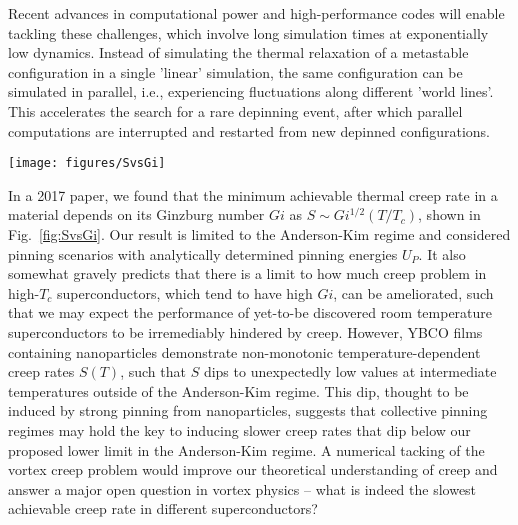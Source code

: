 \documentclass[%
 aip,
 amsmath,amssymb,
 reprint,%
floatfix]{revtex4-1}
\newcommand{\Tc}{T_{c}}
\begin{document}
Recent advances in computational power and high-performance codes will enable tackling these challenges, which involve long simulation times at exponentially low dynamics. Instead of simulating the thermal relaxation of a metastable configuration in a single 'linear' simulation, the same configuration can be simulated in parallel, i.e., experiencing fluctuations along different 'world lines'. This accelerates the search for a rare depinning event, after which parallel computations are interrupted and restarted from new depinned configurations.

%
\begin{figure*}
\texttt{[image: figures/SvsGi]}
\caption{Creep at reduced temperature $T/T_c$ = 1/4 and a field of $\mu_0H = 1 \textnormal{ T}$ for different superconductors plotted versus $Gi^{1/2}$. The open symbols indicate materials for which the microstructure has been modified either by irradiation or incorporation of inclusions. The solid grey line represents the limit set by $Gi^{1/2}(T/T_c)$.  The result predicts that the creep problem even in yet-to-be-discovered high-$T_c$ superconductors may counteract the benefits of high operating temperatures. Material from S. Eley, et al.\ Nat.\ Mater.\ 16, 409–413 (2017). Copyright 2017, \emph{Nature Publishing Group.}
}\label{fig:SvsGi}
\end{figure*}
%




In a 2017 paper\cite{Eley2017a}, we found that the minimum achievable thermal creep rate in a material depends on its Ginzburg number $Gi$ as $S \sim Gi^{1/2}(T/T_c)$, shown in Fig.~\ref{fig:SvsGi}.  Our result is limited to the Anderson-Kim regime and considered pinning scenarios with analytically determined pinning energies $U_P$.  It also somewhat gravely predicts that there is a limit to how much creep problem in high-$\Tc$ superconductors, which tend to have high $Gi$, can be ameliorated, such that we may expect the performance of yet-to-be discovered room temperature superconductors to be irremediably hindered by creep. However, YBCO films containing nanoparticles demonstrate non-monotonic temperature-dependent creep rates $S(T)$, such that $S$ dips to unexpectedly low values at intermediate temperatures outside of the Anderson-Kim regime\cite{Eley2017a}.  This dip, thought to be induced by strong pinning from nanoparticles, suggests that collective pinning regimes may hold the key to inducing slower creep rates that dip below our proposed lower limit in the Anderson-Kim regime.  A numerical tacking of the vortex creep problem would improve our theoretical understanding of creep and answer a major open question in vortex physics -- what is indeed the slowest achievable creep rate in different superconductors?
\end{document}
